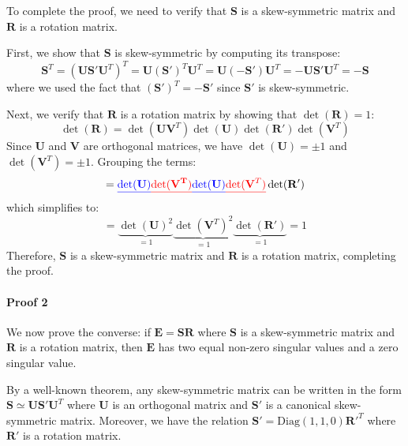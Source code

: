 \documentclass[11pt,a4paper]{article}
\theoremstyle{definition}
\theoremstyle{plain}
\theoremstyle{remark}
\begin{document}
To complete the proof, we need to verify that $\mathbf{S}$ is a skew-symmetric matrix and $\mathbf{R}$ is a rotation matrix. 

First, we show that $\mathbf{S}$ is skew-symmetric by computing its transpose:
\begin{equation} \label{eq:S_skew}
    \mathbf{S}^T = (\mathbf{U} \mathbf{S'} \mathbf{U}^T)^T = \mathbf{U} (\mathbf{S'})^T \mathbf{U}^T = \mathbf{U} (-\mathbf{S'}) \mathbf{U}^T = -\mathbf{U} \mathbf{S'} \mathbf{U}^T = -\mathbf{S}
\end{equation}
where we used the fact that $(\mathbf{S'})^T = -\mathbf{S'}$ since $\mathbf{S'}$ is skew-symmetric.

Next, we verify that $\mathbf{R}$ is a rotation matrix by showing that $\det(\mathbf{R}) = 1$:
\begin{equation} \nonumber
    \det(\mathbf{R}) = \det(\mathbf{U} \mathbf{V}^T) \det(\mathbf{U}) \det(\mathbf{R'}) \det(\mathbf{V}^T) 
\end{equation}
Since $\mathbf{U}$ and $\mathbf{V}$ are orthogonal matrices, we have $\det(\mathbf{U}) = \pm 1$ and $\det(\mathbf{V}^T) = \pm 1$. Grouping the terms:
\begin{equation} \nonumber
    = \textcolor{blue}{\underline{\det(\mathbf{U})}} \textcolor{red}{\underline{\det(\mathbf{V^T})}} \textcolor{blue}{\underline{\det(\mathbf{U})}} \textcolor{red}{\underline{\det(\mathbf{V}^T)}} \det(\mathbf{R'})
\end{equation}
which simplifies to:
\begin{equation} \label{eq:R_rotation}
    = \underbrace{\det(\mathbf{U})^{2}}_{=1} \underbrace{\det(\mathbf{V}^T)^{2}}_{=1} \underbrace{\det(\mathbf{R'})}_{=1} = 1
\end{equation}
Therefore, $\mathbf{S}$ is a skew-symmetric matrix and $\mathbf{R}$ is a rotation matrix, completing the proof.

\paragraph{Proof 2}
We now prove the converse: if $\mathbf{E} = \mathbf{S} \mathbf{R}$ where $\mathbf{S}$ is a skew-symmetric matrix and $\mathbf{R}$ is a rotation matrix, then $\mathbf{E}$ has two equal non-zero singular values and a zero singular value.

By a well-known theorem, any skew-symmetric matrix can be written in the form $\mathbf{S} \simeq \mathbf{U} \mathbf{S'} \mathbf{U}^T$ where $\mathbf{U}$ is an orthogonal matrix and $\mathbf{S'}$ is a canonical skew-symmetric matrix. Moreover, we have the relation $\mathbf{S'} = \text{Diag}(1,1,0) \mathbf{R'}^T$ where $\mathbf{R'}$ is a rotation matrix.
\end{document}
